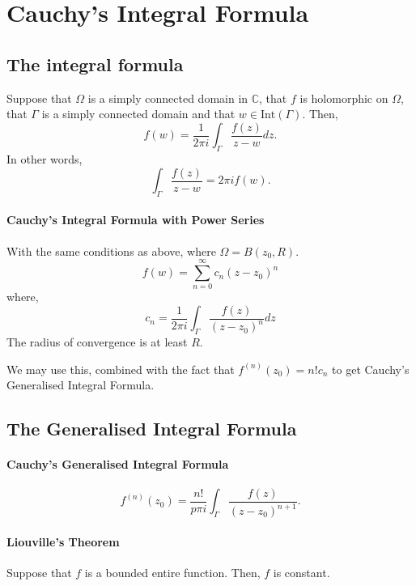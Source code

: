 \documentclass[12pt, letterpaper]{article}
\begin{document}

    \section{Cauchy's Integral Formula}

    \subsection{The integral formula}
    
    Suppose that \(\Omega\) is a simply connected domain in \(\mathbb{C}\),
    that \(f\) is holomorphic on \(\Omega\), that \(\Gamma\) is a simply
    connected domain and that \(w \in \mathrm{Int}(\Gamma)\).
    Then,
    \[ f(w) = \frac{1}{2\pi i} \int_\Gamma \frac{f(z)}{z-w}dz.\]
    In other words, 
    \[ \int_\Gamma \frac{f(z)}{z-w} = 2\pi i f(w).\]


    \paragraph{Cauchy's Integral Formula with Power Series}
    With the same conditions as above, where \(\Omega = B(z_0, R)\).
    \[f(w) = \sum_{n=0}^{\infty} c_n (z-z_0)^n\]
    where,
    \[c_n = \frac{1}{2\pi i} \int_\Gamma \frac{f(z)}{(z-z_0)^n}dz \]
    The radius of convergence is at least \(R\).

    We may use this, combined with the fact that \(f^{(n)} (z_0) = n!c_n\)
    to get Cauchy's Generalised Integral Formula.

    \subsection{The Generalised Integral Formula}
    
    \paragraph{Cauchy's Generalised Integral Formula}
    \[ f^{(n)} (z_0) = \frac{n!}{p\pi i} \int_\Gamma \frac{f(z)}{(z-z_0)^{n+1}}.\]

    \paragraph{Liouville's Theorem} Suppose that \(f\) is a bounded entire  
    function. Then, \(f\) is constant.
\end{document}
